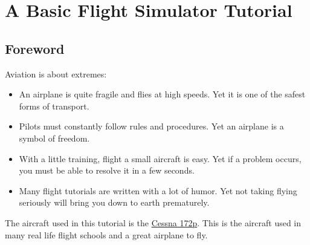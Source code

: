 \newcommand{\weblong}[2]{\href{#1}{#2}} %
\newcommand {\key}[1]{\textbf{\ttfamily{#1}}} %
\newcommand {\button}[1]{\textbf{\sffamily{#1}}} %
\newcommand {\command}[1]{{\ttfamily{#1}}} %
\newcommand {\excl}[1]{
	\begin{tabular}{r p{0.75\textwidth}}
	\hspace*{5mm}\LARGE{\textcolor{green}{$!$
}} & #1\\		
\end{tabular}
}
\newcommand {\photo}[3]
{\begin{center}
  \texttt{[image: img/\#3]}
\end{center}}		

\chapter{A Basic Flight Simulator Tutorial}
\label{basic}

\section{Foreword}
\label{sec:Foreword}
    
Aviation is about extremes:

\begin{itemize}
	\item An airplane is quite fragile and flies at high speeds. 
  Yet it is one of the safest forms of transport.
	\item Pilots must constantly follow rules and procedures. 
  Yet an airplane is a symbol of freedom.
	\item With a little training, flight a small aircraft is easy.
  Yet if a problem occurs, you must be able to resolve it in a  few seconds.
	\item Many flight tutorials are written with a lot of humor.
  Yet not taking flying seriously will bring you down to earth prematurely.
\end{itemize}
    
The aircraft used in this tutorial is the
\weblong{http://en.wikipedia.org/wiki/Cessna_172} {Cessna 172p}. This is the 
aircraft used in many real life flight schools and a great airplane to fly.


